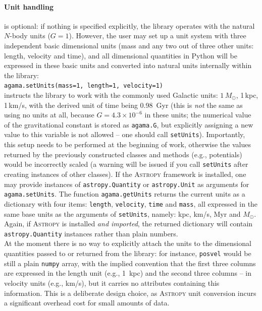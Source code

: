 \documentclass[12pt]{article}
\begin{document}
\paragraph{Unit handling} is optional: if nothing is specified explicitly, the library operates with the natural $N$-body units ($G=1$). However, the user may set up a unit system with three independent basic dimensional units (mass and any two out of three other units: length, velocity and time), and all dimensional quantities in Python will be expressed in these basic units and converted into natural units internally within the library:\\[1mm]
\texttt{agama.setUnits(mass=1, length=1, velocity=1)}\\[1mm]
instructs the library to work with the commonly used Galactic units: $1\,M_\odot$, 1\,kpc, 1\,km/s, with the derived unit of time being 0.98~Gyr (this is \textit{not} the same as using no units at all, because $G=4.3\times10^{-6}$ in these units; the numerical value of the gravitational constant is stored as \texttt{agama.G}, but explicitly assigning a new value to this variable is not allowed -- one should call \texttt{setUnits}). Importantly, this setup needs to be performed at the beginning of work, otherwise the values returned by the previously constructed classes and methods (e.g., potentials) would be incorrectly scaled (a warning will be issued if you call \texttt{setUnits} after creating instances of other classes). If the \textsc{Astropy} framework \cite{Astropy} is installed, one may provide instances of \texttt{astropy.Quantity} or \texttt{astropy.Unit} as arguments for \texttt{agama.setUnits}. The function \texttt{agama.getUnits} returns the current units as a dictionary with four items: \texttt{length}, \texttt{velocity}, \texttt{time} and \texttt{mass}, all expressed in the same base units as the arguments of \texttt{setUnits}, namely: kpc, km/s, Myr and $M_\odot$. Again, if \textsc{Astropy} is installed \textit{and imported}, the returned dictionary will contain \texttt{astropy.Quantity} instances rather than plain numbers.\\
At the moment there is no way to explicitly attach the units to the dimensional quantities passed to or returned from the library: for instance, \texttt{posvel} would be still a plain \texttt{numpy} array, with the implied convention that the first three columns are expressed in the length unit (e.g., 1~kpc) and the second three columns -- in velocity units (e.g., km/s), but it carries no attributes containing this information. This is a deliberate design choice, as \textsc{Astropy} unit conversion incurs a significant overhead cost for small amounts of data.
\end{document}
